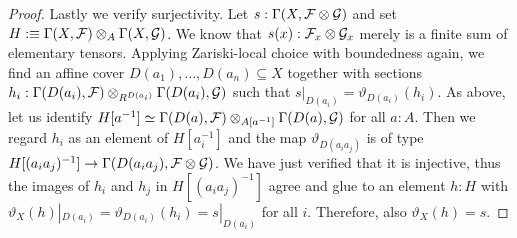 \begin{proof}
  Lastly we verify surjectivity.
  Let $s:\Gamma(X,\mathcal{F} \otimes \mathcal{G})$ and set $H :\equiv \Gamma(X,\mathcal{F}) \otimes_A \Gamma(X,\mathcal{G})$.
  We know that $s(x) : \mathcal{F}_x \otimes \mathcal{G}_x$ merely is a finite sum of elementary tensors.
  Applying Zariski-local choice with boundedness again, we find an affine cover $D(a_1),\dots,D(a_n) \subseteq X$ together with sections $h_i : \Gamma(D(a_i), \mathcal{F}) \otimes_{R^{D(a_i)}} \Gamma(D(a_i),\mathcal{G})$ such that $s|_{D(a_i)} = \vartheta_{D(a_i)}(h_i)$.
  As above, let us identify $H[a^{-1}] \simeq \Gamma(D(a),\mathcal{F}) \otimes_{A[a^{-1}]} \Gamma(D(a), \mathcal{G})$ for all $a:A$.
  Then we regard $h_i$ as an element of $H[a_i^{-1}]$ and  the map $\vartheta_{D(a_ia_j)}$ is of type $H[(a_ia_j)^{-1}] \to \Gamma(D(a_ia_j),\mathcal{F} \otimes \mathcal{G})$.
  We have just verified that it is injective, thus the images of $h_i$ and $h_j$ in $H[(a_ia_j)^{-1}]$ agree and glue to an element $h : H$ with $\vartheta_X(h)|_{D(a_i)} = \vartheta_{D(a_i)}(h_i) = s|_{D(a_i)}$ for all $i$.
  Therefore, also $\vartheta_X(h) = s$.
\end{proof}
